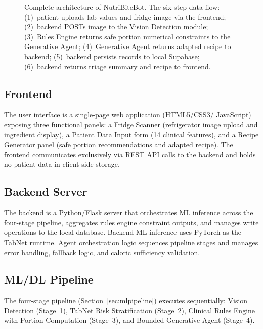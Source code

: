 \documentclass[journal]{IEEEtran}
\begin{document}
\begin{figure}[!t]
    \centering
    \caption{Complete architecture of NutriBiteBot. The six-step
    data flow: (1)~patient uploads lab values and fridge image via the
    frontend; (2)~backend POSTs image to the Vision Detection module;
    (3)~Rules Engine returns safe portion numerical constraints to the
    Generative Agent; (4)~Generative Agent returns adapted recipe to
    backend; (5)~backend persists records to local Supabase; (6)~backend
    returns triage summary and recipe to frontend.}
    \label{fig:architecture}
\end{figure}

\subsection{Frontend}
The user interface is a single-page web application (HTML5/CSS3/
JavaScript) exposing three functional panels: a Fridge Scanner
(refrigerator image upload and ingredient display), a Patient Data Input
form (14 clinical features), and a Recipe Generator panel (safe portion
recommendations and adapted recipe). The frontend communicates exclusively
via REST API calls to the backend and holds no patient data in
client-side storage.

\subsection{Backend Server}
The backend is a Python/Flask server that orchestrates ML inference
across the four-stage pipeline, aggregates rules engine constraint
outputs, and manages write operations to the local database. Backend
ML inference uses PyTorch as the TabNet runtime. Agent orchestration
logic sequences pipeline stages and manages error handling, fallback
logic, and caloric sufficiency validation.

\subsection{ML/DL Pipeline}
The four-stage pipeline (Section~\ref{sec:mlpipeline}) executes
sequentially: Vision Detection (Stage~1), TabNet Risk Stratification
(Stage~2), Clinical Rules Engine with Portion Computation (Stage~3),
and Bounded Generative Agent (Stage~4).
\end{document}
